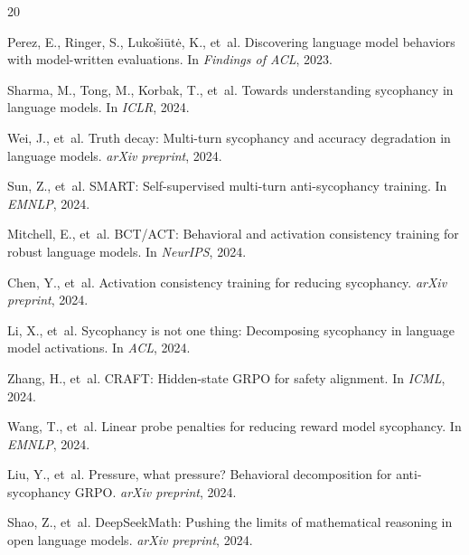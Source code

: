 \documentclass[11pt,a4paper]{article}
\begin{document}

\begin{thebibliography}{20}

Perez, E., Ringer, S., Luko{\v{s}}i{\={u}}t{\.e}, K., et~al.
\newblock Discovering language model behaviors with model-written evaluations.
\newblock In \emph{Findings of ACL}, 2023.

Sharma, M., Tong, M., Korbak, T., et~al.
\newblock Towards understanding sycophancy in language models.
\newblock In \emph{ICLR}, 2024.

Wei, J., et~al.
\newblock Truth decay: Multi-turn sycophancy and accuracy degradation in language models.
\newblock \emph{arXiv preprint}, 2024.

Sun, Z., et~al.
\newblock SMART: Self-supervised multi-turn anti-sycophancy training.
\newblock In \emph{EMNLP}, 2024.

Mitchell, E., et~al.
\newblock BCT/ACT: Behavioral and activation consistency training for robust language models.
\newblock In \emph{NeurIPS}, 2024.

Chen, Y., et~al.
\newblock Activation consistency training for reducing sycophancy.
\newblock \emph{arXiv preprint}, 2024.

Li, X., et~al.
\newblock Sycophancy is not one thing: Decomposing sycophancy in language model activations.
\newblock In \emph{ACL}, 2024.

Zhang, H., et~al.
\newblock CRAFT: Hidden-state GRPO for safety alignment.
\newblock In \emph{ICML}, 2024.

Wang, T., et~al.
\newblock Linear probe penalties for reducing reward model sycophancy.
\newblock In \emph{EMNLP}, 2024.

Liu, Y., et~al.
\newblock Pressure, what pressure? Behavioral decomposition for anti-sycophancy GRPO.
\newblock \emph{arXiv preprint}, 2024.

Shao, Z., et~al.
\newblock DeepSeekMath: Pushing the limits of mathematical reasoning in open language models.
\newblock \emph{arXiv preprint}, 2024.


\end{thebibliography}
\end{document}
